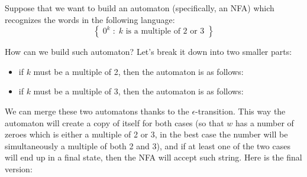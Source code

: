 \begin{example}
    Suppose that we want to build an automaton (specifically, an NFA) which recognizes the words in the following language:
    \[ \left\{ \; 0^k \; : \; k \text{ is a multiple of 2 or 3 } \right\} \]

    How can we build such automaton? Let's break it down into two smaller parts:
    \begin{itemize}
        \item if $k$ must be a multiple of 2, then the automaton is as follows:
        \begin{center}
        \end{center}

        \item if $k$ must be a multiple of 3, then the automaton is as follows:
        \begin{center}
        \end{center}
    \end{itemize}

    We can merge these two automatons thanks to the $\epsilon$-transition. This way the automaton will create a copy of itself for both cases (so that $w$ has a number of zeroes which is either a multiple of 2 or 3, in the best case the number will be simultaneously a multiple of both 2 and 3), and if at least one of the two cases will end up in a final state, then the NFA will accept such string. Here is the final version:


\end{example}
